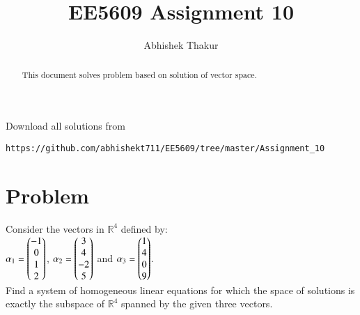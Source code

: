 \documentclass[journal,12pt,twocolumn]{IEEEtran}
\begin{document}
     \def\rightbox#1{\makebox[0in][r]{#1}}
     \def\centbox#1{\makebox[0in]{#1}}
     \def\topbox#1{\raisebox{-\baselineskip}[0in][0in]{#1}}
     \def\midbox#1{\raisebox{-0.5\baselineskip}[0in][0in]{#1}}
\vspace{3cm}
\title{EE5609 Assignment 10}
\author{Abhishek Thakur}
\maketitle
\newpage
\bigskip
\renewcommand{\thefigure}{\theenumi}
\renewcommand{\thetable}{\theenumi}
\begin{abstract}
This document solves problem based on solution of vector space.
\end{abstract}
Download all solutions from 
\begin{lstlisting}
https://github.com/abhishekt711/EE5609/tree/master/Assignment_10
\end{lstlisting}
\section{Problem}
Consider the vectors in $\mathbb{R}^4$ defined by:\\
$\alpha_1=\begin{pmatrix}-1\\0\\1\\2\end{pmatrix}$, $\alpha_2=\begin{pmatrix}3\\4\\-2\\5\end{pmatrix}$ and $\alpha_3=\begin{pmatrix}1\\4\\0\\9\end{pmatrix}$.\\
Find a system of homogeneous linear equations for which the space of solutions is exactly the subspace of $\mathbb{R}^4$ spanned by the given three vectors.\\
\end{document}
